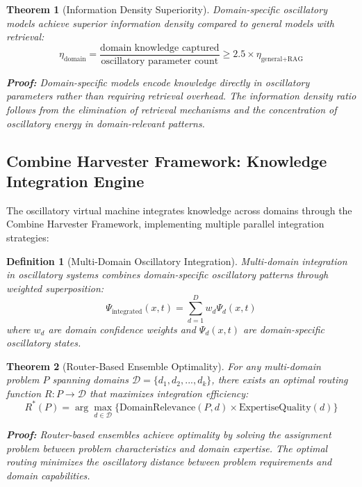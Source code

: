 \documentclass[12pt,a4paper]{article}
\newtheorem{theorem}{Theorem}
\newtheorem{definition}{Definition}
\begin{document}
\begin{theorem}[Information Density Superiority]
Domain-specific oscillatory models achieve superior information density compared to general models with retrieval:
\begin{equation}
\eta_{\text{domain}} = \frac{\text{domain knowledge captured}}{\text{oscillatory parameter count}} \geq 2.5 \times \eta_{\text{general+RAG}}
\end{equation}

\textbf{Proof:}
Domain-specific models encode knowledge directly in oscillatory parameters rather than requiring retrieval overhead. The information density ratio follows from the elimination of retrieval mechanisms and the concentration of oscillatory energy in domain-relevant patterns.
\end{theorem}

\subsection{Combine Harvester Framework: Knowledge Integration Engine}

The oscillatory virtual machine integrates knowledge across domains through the Combine Harvester Framework, implementing multiple parallel integration strategies:

\begin{definition}[Multi-Domain Oscillatory Integration]
Multi-domain integration in oscillatory systems combines domain-specific oscillatory patterns through weighted superposition:
\begin{equation}
\Psi_{\text{integrated}}(x,t) = \sum_{d=1}^{D} w_d \Psi_d(x,t)
\end{equation}
where $w_d$ are domain confidence weights and $\Psi_d(x,t)$ are domain-specific oscillatory states.
\end{definition}

\begin{theorem}[Router-Based Ensemble Optimality]
For any multi-domain problem $P$ spanning domains $\mathcal{D} = \{d_1, d_2, ..., d_k\}$, there exists an optimal routing function $R: P \rightarrow \mathcal{D}$ that maximizes integration efficiency:
\begin{equation}
R^*(P) = \arg\max_{d \in \mathcal{D}} \{\text{DomainRelevance}(P, d) \times \text{ExpertiseQuality}(d)\}
\end{equation}

\textbf{Proof:}
Router-based ensembles achieve optimality by solving the assignment problem between problem characteristics and domain expertise. The optimal routing minimizes the oscillatory distance between problem requirements and domain capabilities.
\end{theorem}
\end{document}
